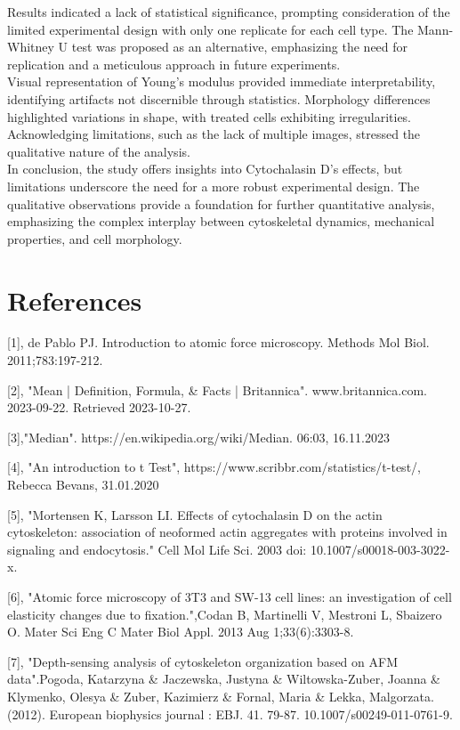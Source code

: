 \documentclass[a4paper,english,12pt,bibliography=totoc]{scrreprt}
\begin{document}
Results indicated a lack of statistical significance, prompting consideration of the limited experimental design with only one replicate for each cell type. The Mann-Whitney U test was proposed as an alternative, emphasizing the need for replication and a meticulous approach in future experiments.\\

Visual representation of Young's modulus provided immediate interpretability, identifying artifacts not discernible through statistics. Morphology differences highlighted variations in shape, with treated cells exhibiting irregularities. Acknowledging limitations, such as the lack of multiple images, stressed the qualitative nature of the analysis.\\

In conclusion, the study offers insights into Cytochalasin D's effects, but limitations underscore the need for a more robust experimental design. The qualitative observations provide a foundation for further quantitative analysis, emphasizing the complex interplay between cytoskeletal dynamics, mechanical properties, and cell morphology.

\chapter{References}
\label{cha:References}
[1], de Pablo PJ. Introduction to atomic force microscopy. Methods Mol Biol. 2011;783:197-212.

[2], "Mean | Definition, Formula, \& Facts | Britannica". www.britannica.com. 2023-09-22. Retrieved 2023-10-27.

[3],"Median". https://en.wikipedia.org/wiki/Median. 06:03, 16.11.2023

[4], "An introduction to t Test", https://www.scribbr.com/statistics/t-test/, Rebecca Bevans, 31.01.2020

[5], "Mortensen K, Larsson LI. Effects of cytochalasin D on the actin cytoskeleton: association of neoformed actin aggregates with proteins involved in signaling and endocytosis." Cell Mol Life Sci. 2003  doi: 10.1007/s00018-003-3022-x.

[6], "Atomic force microscopy of 3T3 and SW-13 cell lines: an investigation of cell elasticity changes due to fixation.",Codan B, Martinelli V, Mestroni L, Sbaizero O. Mater Sci Eng C Mater Biol Appl. 2013 Aug 1;33(6):3303-8.

[7], "Depth-sensing analysis of cytoskeleton organization based on AFM data".Pogoda, Katarzyna \& Jaczewska, Justyna \& Wiltowska-Zuber, Joanna \& Klymenko, Olesya \& Zuber, Kazimierz \& Fornal, Maria \& Lekka, Malgorzata. (2012).  European biophysics journal : EBJ. 41. 79-87. 10.1007/s00249-011-0761-9. 
\end{document}

